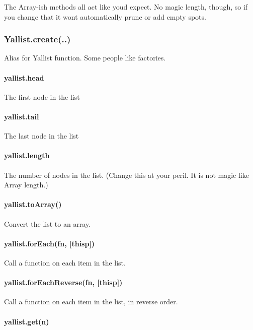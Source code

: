 The Array-\/ish methods all act like you\textquotesingle{}d expect. No magic length, though, so if you change that it won\textquotesingle{}t automatically prune or add empty spots.

\subsubsection*{Yallist.\+create(..)}

Alias for Yallist function. Some people like factories.

\paragraph*{yallist.\+head}

The first node in the list

\paragraph*{yallist.\+tail}

The last node in the list

\paragraph*{yallist.\+length}

The number of nodes in the list. (Change this at your peril. It is not magic like Array length.)

\paragraph*{yallist.\+to\+Array()}

Convert the list to an array.

\paragraph*{yallist.\+for\+Each(fn, \mbox{[}thisp\mbox{]})}

Call a function on each item in the list.

\paragraph*{yallist.\+for\+Each\+Reverse(fn, \mbox{[}thisp\mbox{]})}

Call a function on each item in the list, in reverse order.

\paragraph*{yallist.\+get(n)}

